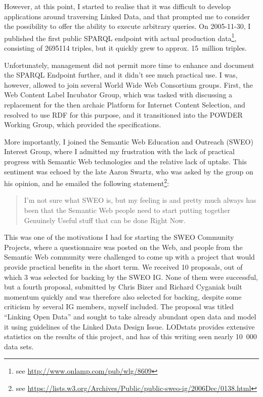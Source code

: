 However, at this point, I started to realise that it was difficult to
develop applications around traversing Linked Data, and that
prompted me to consider the possibility to offer the ability to
execute arbitrary queries. On 2005-11-30, I published the first public
SPARQL endpoint with actual production data\footnote{see
  \url{http://www.onlamp.com/pub/wlg/8609}}, consisting of 2695114
triples, but it quickly grew to approx. 15~million triples.

Unfortunately, management did not permit more time to enhance and document the
SPARQL Endpoint further, and it didn't see much practical use. 
I was, however, allowed to join several World Wide Web Consortium
groups. First, the Web Content Label Incubator Group, which was tasked
with discussing a replacement for the then archaic Platform for
Internet Content Selection, and resolved to use RDF for this
purpose, and it transitioned into the POWDER Working Group, which
provided the specifications. 

More importantly, I joined the Semantic Web Education and Outreach
(SWEO) Interest Group, where I admitted my frustration with the lack
of practical progress with Semantic Web technologies and the relative
lack of uptake. This sentiment was echoed by the late Aaron Swartz,
who was asked by the group on his opinion, and he emailed the
following statement\footnote{see
  \url{https://lists.w3.org/Archives/Public/public-sweo-ig/2006Dec/0138.html}}:
\begin{quote}
I'm not sure what SWEO is, but my feeling is and pretty much always
has been that the Semantic Web people need to start putting together
Genuinely Useful stuff that can be done Right Now.
\end{quote}

This was one of the motivations I had for starting the SWEO Community
Projects, where a questionnaire was posted on the Web, and people from
the Semantic Web community were challenged to come up with a project
that would provide practical benefits in the short term. We received
10 proposals, out of which 3 was selected for backing by the SWEO
IG. None of them were successful, but a fourth proposal, submitted by
Chris Bizer and Richard Cyganiak built momentum quickly and was
therefore also selected for backing, despite some criticism by several
IG members, myself included. The proposal was titled ``Linking Open
Data'' and sought to take already abundant open data and model it
using guidelines of the Linked Data Design
Issue\cite{linkeddataissue}. LODstats\cite{auer2012lodstats} provides
extensive statistics on the results of this project, and has of this
writing seen nearly 10~000 data sets.

